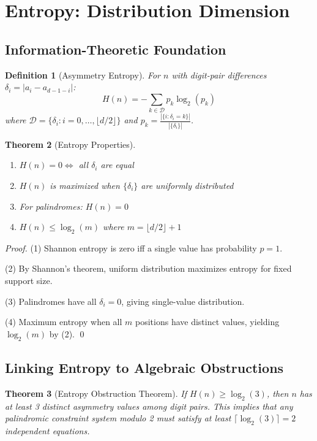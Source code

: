 \documentclass[12pt,a4paper]{article}
\newtheorem{theorem}{Theorem}[section]
\newtheorem{definition}[theorem]{Definition}
\begin{document}
\section{Entropy: Distribution Dimension}

\subsection{Information-Theoretic Foundation}

\begin{definition}[Asymmetry Entropy]
For $n$ with digit-pair differences $\delta_i = |a_i - a_{d-1-i}|$:
$$H(n) = -\sum_{k \in \mathcal{D}} p_k \log_2(p_k)$$
where $\mathcal{D} = \{\delta_i : i = 0, \ldots, \lfloor d/2 \rfloor\}$ and $p_k = \frac{|\{i : \delta_i = k\}|}{|\{\delta_i\}|}$.
\end{definition}

\begin{theorem}[Entropy Properties]\label{thm:entropy_prop}
\begin{enumerate}
\item $H(n) = 0 \Leftrightarrow$ all $\delta_i$ are equal
\item $H(n)$ is maximized when $\{\delta_i\}$ are uniformly distributed
\item For palindromes: $H(n) = 0$
\item $H(n) \leq \log_2(m)$ where $m = \lfloor d/2 \rfloor + 1$
\end{enumerate}
\end{theorem}

\begin{proof}
(1) Shannon entropy is zero iff a single value has probability $p = 1$.

(2) By Shannon's theorem, uniform distribution maximizes entropy for fixed support size.

(3) Palindromes have all $\delta_i = 0$, giving single-value distribution.

(4) Maximum entropy when all $m$ positions have distinct values, yielding $\log_2(m)$ by (2). \qed
\end{proof}

\subsection{Linking Entropy to Algebraic Obstructions}

\begin{theorem}[Entropy Obstruction Theorem]\label{thm:entropy_obst}
If $H(n) \geq \log_2(3)$, then $n$ has at least 3 distinct asymmetry values among digit pairs. This implies that any palindromic constraint system modulo 2 must satisfy at least $\lceil \log_2(3) \rceil = 2$ independent equations.
\end{theorem}
\end{document}
